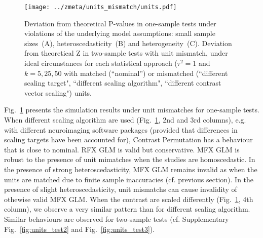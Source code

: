 \documentclass[preprint]{elsarticle}
\newcommand{\nStudies}{k}
\newcommand{\varBetween}{\tau^2}
\begin{document}
\begin{figure}[h]
	\centering
 	\texttt{[image: ../zmeta/units\_mismatch/units.pdf]}
	\caption{Deviation from theoretical P-values in one-sample tests under violations of the underlying model assumptions: small sample sizes~(A), heteroscedasticity~(B) and heterogeneity~(C). Deviation from theoretical Z in two-sample tests with unit mismatch, under ideal circunstances for each statistical approach ($\varBetween=1$ and $\nStudies = 5, 25, 50$ with matched (``nominal'') or mismatched (``different scaling target", ``different scaling algorithm", ``different contrast vector scaling") units.}
	\label{fig:units}
\end{figure}

Fig.~\ref{fig:units} presents the simulation results under unit mismatches for one-sample tests. When different scaling algorithm are used (Fig.~\ref{fig:units}, 2nd and 3rd columns), e.g. with different neuroimaging software packages (provided that differences in scaling targets have been accounted for), Contrast Permutation has a behaviour that is close to nominal. RFX GLM is valid but conservative. MFX GLM is robust to the presence of unit mimatches when the studies are homoscedastic. In the presence of strong heteroscedasticity, MFX GLM remains invalid as when the units are matched due to finite sample inaccuracies (cf. previous section). In the presence of slight heteroscedasticity, unit mismatchs can cause invalidity of othewise valid MFX GLM. When the contrast are scaled differently (Fig.~\ref{fig:units}, 4th column), we observe a very similar pattern than for different scaling algorithm. Similar behaviours are observed for two-sample tests (cf. Supplementary Fig.~\ref{fig:units_test2} and Fig.~\ref{fig:units_test3}).


\end{document}
